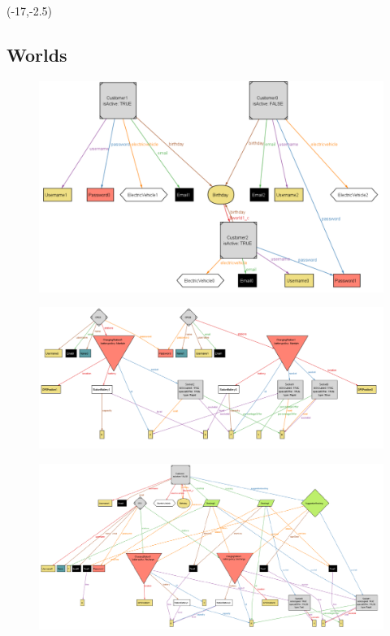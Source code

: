 	\pagestyle{empty}
	\begin{landscape}
		\begin{textblock}{20}(-17,-2.5){}
			\subsection{Worlds}
			\begin{figure}[H]
				\vspace{100px}
				\hspace{-100px}
				\includegraphics[scale=1.3]{img/world1.pdf}
			\end{figure}
		\end{textblock}
		\begin{figure}[H]
			\vspace*{-100px}
			\hspace*{-170px}
			\includegraphics[scale=1.3]{img/world2.pdf}
		\end{figure}
		\thispagestyle{empty}
		\begin{figure}[H]
			\vspace*{-100px}
			\hspace*{-150px}
			\includegraphics[scale=1.3]{img/world3.pdf}
		\end{figure}
	\end{landscape}
    

